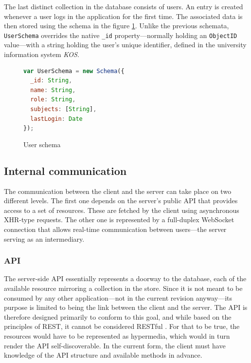 \documentclass[thesis=M,english,hidelinks]{FITthesis}[2012/10/20]
\newcommand{\code}{\texttt}
\begin{document}
The last distinct collection in the database consists of users. An entry is created whenever a user logs in the application for the first time. The associated data is then stored using the schema in the figure \ref{fig:user_schema}. Unlike the previous schemata, \code{UserSchema} overrides the native \code{\_id} property---normally holding an \code{ObjectID} value---with a string holding the user's unique identifier, defined in the university information system \textit{KOS}.

\begin{figure}
  \begin{lstlisting}[language=JavaScript]
var UserSchema = new Schema({
  _id: String,
  name: String,
  role: String,
  subjects: [String],
  lastLogin: Date
});
  \end{lstlisting}
  \caption{User schema}
  \label{fig:user_schema}
\end{figure}

    \subsection{Internal communication}

The communication between the client and the server can take place on two different levels. The first one depends on the server's public API that provides access to a set of resources. These are fetched by the client using asynchronous XHR-type requests. The other one is represented by a full-duplex WebSocket connection that allows real-time communication between users---the server serving as an intermediary.

      \subsubsection{API}

The server-side API essentially represents a doorway to the database, each of the available resource mirroring a collection in the store. Since it is not meant to be consumed by any other application---not in the current revision anyway---its purpose is limited to being the link between the client and the server. The API is therefore designed primarily to conform to this goal, and while based on the principles of REST, it cannot be considered RESTful \cite{rest}. For that to be true, the resources would have to be represented as hypermedia, which would in turn render the API self-discoverable. In the current form, the client must have knowledge of the API structure and available methods in advance.
\end{document}
